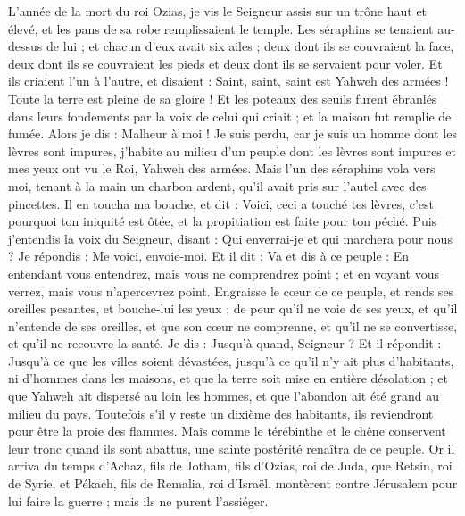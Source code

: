 \begin{multicols}{2}
\VerseOne{}L'année de la mort du roi Ozias, je vis le Seigneur assis sur un trône haut et élevé, et les pans de sa robe remplissaient le temple.
Les séraphins se tenaient au-dessus de lui ; et chacun d'eux avait six ailes ; deux dont ils se couvraient la face, deux dont ils se couvraient les pieds et deux dont ils se servaient pour voler.
Et ils criaient l'un à l'autre, et disaient : Saint, saint, saint est Yahweh des armées ! Toute la terre est pleine de sa gloire !
Et les poteaux des seuils furent ébranlés dans leurs fondements par la voix de celui qui criait ; et la maison fut remplie de fumée.
Alors je dis : Malheur à moi ! Je suis perdu, car je suis un homme dont les lèvres sont impures, j'habite au milieu d'un peuple dont les lèvres sont impures et mes yeux ont vu le Roi, Yahweh des armées.
Mais l'un des séraphins vola vers moi, tenant à la main un charbon ardent, qu'il avait pris sur l'autel avec des pincettes.
Il en toucha ma bouche, et dit : Voici, ceci a touché tes lèvres, c'est pourquoi ton iniquité est ôtée, et la propitiation est faite pour ton péché.
Puis j'entendis la voix du Seigneur, disant : Qui enverrai-je et qui marchera pour nous ? Je répondis : Me voici, envoie-moi.
Et il dit : Va et dis à ce peuple : En entendant vous entendrez, mais vous ne comprendrez point ; et en voyant vous verrez, mais vous n'apercevrez point.
Engraisse le cœur de ce peuple, et rends ses oreilles pesantes, et bouche-lui les yeux ; de peur qu'il ne voie de ses yeux, et qu'il n'entende de ses oreilles, et que son cœur ne comprenne, et qu'il ne se convertisse, et qu'il ne recouvre la santé.
Je dis : Jusqu'à quand, Seigneur ? Et il répondit : Jusqu'à ce que les villes soient dévastées, jusqu'à ce qu'il n'y ait plus d'habitants, ni d'hommes dans les maisons, et que la terre soit mise en entière désolation ;
 et que Yahweh ait dispersé au loin les hommes, et que l'abandon ait été grand au milieu du pays.
Toutefois s'il y reste un dixième des habitants, ils reviendront pour être la proie des flammes. Mais comme le térébinthe et le chêne conservent leur tronc quand ils sont abattus, une sainte postérité renaîtra de ce peuple.
\VerseOne{}Or il arriva du temps d'Achaz, fils de Jotham, fils d'Ozias, roi de Juda, que Retsin, roi de Syrie, et Pékach, fils de Remalia, roi d'Israël, montèrent contre Jérusalem pour lui faire la guerre ; mais ils ne purent l'assiéger.

\end{multicols}
